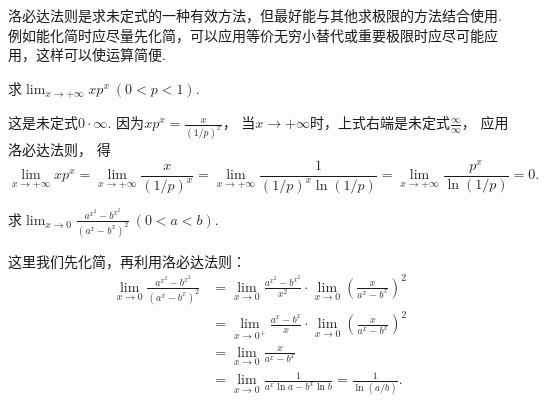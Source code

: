洛必达法则是求未定式的一种有效方法，但最好能与其他求极限的方法结合使用.
例如能化简时应尽量先化简，可以应用等价无穷小替代或重要极限时应尽可能应用，这样可以使运算简便.

\begin{example}\label{example:微分中值定理.洛必达法则.零乘无穷大型2}
求\(\lim_{x\to+\infty} x p^x\ (0<p<1)\).
\begin{solution}
这是未定式\(0\cdot\infty\).
因为\(x p^x =  \frac{x}{(1/p)^x}\)，
当\(x\to+\infty\)时，上式右端是未定式\(\frac{\infty}{\infty}\)，
应用洛必达法则，
得\[
	\lim_{x\to+\infty} x p^x
	= \lim_{x\to+\infty} \frac{x}{(1/p)^x}
	= \lim_{x\to+\infty} \frac{1}{(1/p)^x \ln(1/p)}
	= \lim_{x\to+\infty} \frac{p^x}{\ln(1/p)}
	= 0.
\]
\end{solution}
\end{example}

\begin{example}
求\(\lim_{x\to0} \frac{a^{x^2}-b^{x^2}}{(a^x-b^x)^2}\ (0<a<b)\).
\begin{solution}
这里我们先化简，再利用洛必达法则：\begin{align*}
	\lim_{x\to0} \frac{a^{x^2}-b^{x^2}}{(a^x-b^x)^2}
	&= \lim_{x\to0} \frac{a^{x^2}-b^{x^2}}{x^2}
		\cdot \lim_{x\to0} \left(\frac{x}{a^x-b^x}\right)^2 \\
	&= \lim_{x\to0^+} \frac{a^x-b^x}{x}
		\cdot \lim_{x\to0} \left(\frac{x}{a^x-b^x}\right)^2 \\
	&= \lim_{x\to0} \frac{x}{a^x-b^x} \\
	&= \lim_{x\to0} \frac{1}{a^x \ln a - b^x \ln b}
	= \frac{1}{\ln(a/b)}.
\end{align*}
\end{solution}
\end{example}
